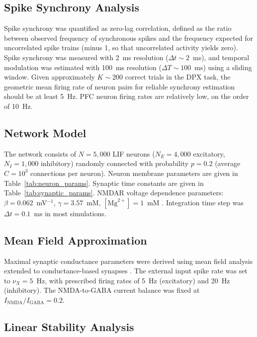\documentclass[10pt]{article}
\begin{document}
\subsection{Spike Synchrony Analysis}

Spike synchrony was quantified as zero-lag correlation, defined as the ratio between observed frequency of synchronous spikes and the frequency expected for uncorrelated spike trains (minus 1, so that uncorrelated activity yields zero). Spike synchrony was measured with 2~ms resolution ($\Delta t \sim 2$~ms), and temporal modulation was estimated with 100~ms resolution ($\Delta T \sim 100$~ms) using a sliding window. Given approximately $K \sim 200$ correct trials in the DPX task, the geometric mean firing rate of neuron pairs for reliable synchrony estimation should be at least 5~Hz. PFC neuron firing rates are relatively low, on the order of 10~Hz.

\subsection{Network Model}

The network consists of $N = 5{,}000$ LIF neurons ($N_E = 4{,}000$ excitatory, $N_I = 1{,}000$ inhibitory) randomly connected with probability $p = 0.2$ (average $C = 10^3$ connections per neuron). Neuron membrane parameters are given in Table~\ref{tab:neuron_params}. Synaptic time constants are given in Table~\ref{tab:synaptic_params}. NMDAR voltage dependence parameters: $\beta = 0.062$~mV$^{-1}$, $\gamma = 3.57$~mM, $[\text{Mg}^{2+}] = 1$~mM \citep{jahr1990dose}. Integration time step was $\Delta t = 0.1$~ms in most simulations.

\subsection{Mean Field Approximation}

Maximal synaptic conductance parameters were derived using mean field analysis \citep{amit1997model, brunel2000dynamics} extended to conductance-based synapses \citep{brunel2001effects, renart2003mean}. The external input spike rate was set to $\nu_X = 5$~Hz, with prescribed firing rates of 5~Hz (excitatory) and 20~Hz (inhibitory). The NMDA-to-GABA current balance was fixed at $I_{\text{NMDA}}/I_{\text{GABA}} = 0.2$.

\subsection{Linear Stability Analysis}
\end{document}
